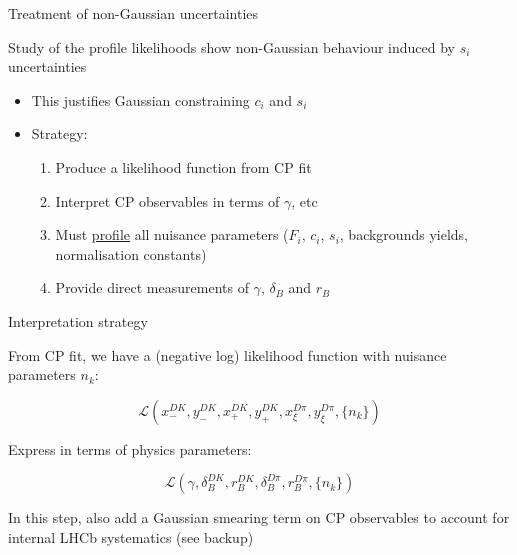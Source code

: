 \documentclass[xcolor={dvipsnames}]{beamer}
\begin{document}
\begin{frame}{Treatment of non-Gaussian uncertainties}
  \begin{center}
    {\large Study of the profile likelihoods show non-Gaussian behaviour induced by $s_i$ uncertainties}
  \end{center}
  \begin{itemize}
    \setlength\itemsep{1.5em}
    \item{This justifies Gaussian constraining $c_i$ and $s_i$}
    \item{Strategy:}
    \begin{enumerate}
      \setlength\itemsep{0.5em}
      \item{Produce a likelihood function from CP fit}
      \item{Interpret CP observables in terms of $\gamma$, etc}
      \item{Must \underline{profile} all nuisance parameters ($F_i$, $c_i$, $s_i$, backgrounds yields, normalisation constants)}
      \item{Provide direct measurements of $\gamma$, $\delta_B$ and $r_B$}
    \end{enumerate}
  \end{itemize}
\end{frame}

\begin{frame}{Interpretation strategy}
  \begin{center}
    {\large From CP fit, we have a (negative log) likelihood function with nuisance parameters $n_k$:}
  \end{center}
  \begin{equation*}
    \mathcal{L}(x_-^{DK}, y_-^{DK}, x_+^{DK}, y_+^{DK}, x_\xi^{D\pi}, y_\xi^{D\pi}, \{n_k\})
  \end{equation*}
  \vspace{0.1cm}
  \begin{center}
    {\large Express in terms of physics parameters:}
  \end{center}
  \begin{equation*}
    \mathcal{L}(\gamma, \delta_B^{DK}, r_B^{DK}, \delta_B^{D\pi}, r_B^{D\pi}, \{n_k\})
  \end{equation*}
  \vspace{0.1cm}
  \begin{center}
    {\normalsize In this step, also add a Gaussian smearing term on CP observables to account for internal LHCb systematics (see backup)}
  \end{center}
\end{frame}
\end{document}
